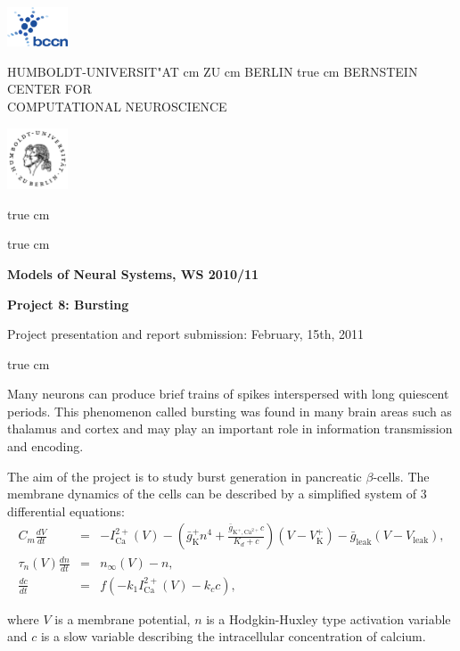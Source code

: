 \documentclass[12pt]{article}
\newcommand{\K}{\text{K}^+}
\newcommand{\Ca}{\text{Ca}^{2+}}
\newcommand{\Leak}{\text{leak}}
\begin{document}
\parbox{2cm}{
\includegraphics[width=1.8cm]{bccnlogo.pdf}
}
\parbox{11cm}{
\begin{center}
\large HUMBOLDT-UNIVERSIT"AT  cm ZU  cm BERLIN
 true cm
\mgross BERNSTEIN CENTER FOR\\ COMPUTATIONAL NEUROSCIENCE
\end{center}
}
\parbox{2cm}
{
\hfill
\includegraphics[width=1.8cm]{hublogo.pdf}
}

 true cm



 true cm
\centerline{\bf Models of Neural Systems, WS 2010/11}
\centerline{\bf Project 8: Bursting}
\centerline{Project presentation and report submission: February, 15th, 2011}

 true cm

Many neurons can produce brief trains of spikes interspersed with
long quiescent periods. This phenomenon called bursting was found in many
brain areas such as thalamus and cortex and may play an important role
in information transmission and encoding.

The aim of the project is to study burst generation in
pancreatic $\beta$-cells. The membrane dynamics of the cells can be
described by a simplified system of 3 differential equations: 
\begin{eqnarray}
    C_m\frac{dV}{dt}&=&-I_\Ca(V)-\left(\bar{g}_\K
    n^4+\frac{\bar{g}_{\K,\Ca}c}{K_d+c}\right)(V-V_\K)-\bar{g}_\Leak(V-V_\Leak),
    \label{eq:pancreatic1}\\
\tau_n(V)\frac{dn}{dt}&=&n_\infty(V)-n,\label{eq:pancreatic2} \\
\frac{dc}{dt}&=&f(-k_1 I_\Ca(V)-k_cc), \label{eq:pancreatic3}
\end{eqnarray}

where $V$ is a membrane potential, $n$ is a Hodgkin-Huxley type
activation variable  and $c$ is a slow variable
describing the intracellular concentration of calcium.
\end{document}
